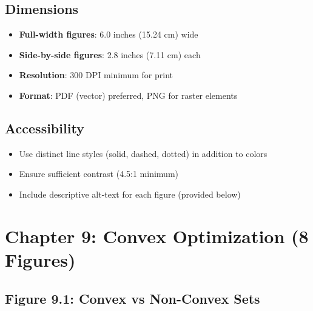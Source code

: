 \documentclass[12pt]{article}
\begin{document}
\subsection{Dimensions}
\begin{itemize}
    \item \textbf{Full-width figures}: 6.0 inches (15.24 cm) wide
    \item \textbf{Side-by-side figures}: 2.8 inches (7.11 cm) each
    \item \textbf{Resolution}: 300 DPI minimum for print
    \item \textbf{Format}: PDF (vector) preferred, PNG for raster elements
\end{itemize}

\subsection{Accessibility}
\begin{itemize}
    \item Use distinct line styles (solid, dashed, dotted) in addition to colors
    \item Ensure sufficient contrast (4.5:1 minimum)
    \item Include descriptive alt-text for each figure (provided below)
\end{itemize}

\newpage

\section{Chapter 9: Convex Optimization (8 Figures)}

\subsection{Figure 9.1: Convex vs Non-Convex Sets}
\end{document}
